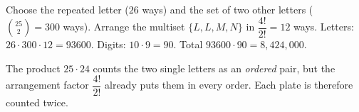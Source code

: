 Choose the repeated letter ($26$ ways) and the set of two other letters ($\binom{25}{2}=300$ ways). Arrange the multiset $\{L,L,M,N\}$ in $\dfrac{4!}{2!}=12$ ways. Letters: $26\cdot300\cdot12=93600$. Digits: $10\cdot9=90$. Total $93600\cdot90=\boxed{8{,}424{,}000}$.

The product $25\cdot24$ counts the two single letters as an \emph{ordered} pair, but the arrangement factor $\dfrac{4!}{2!}$ already puts them in every order. Each plate is therefore counted twice.
